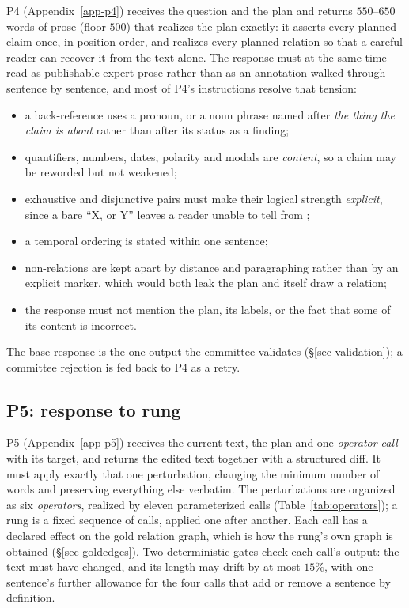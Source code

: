 P4 (Appendix~\ref{app-p4}) receives the question and the plan and returns $550$--$650$ words of prose (floor
$500$) that realizes the plan exactly: it asserts every planned claim once, in position order, and realizes every
planned relation so that a careful reader can recover it from the text alone. The response must at the same time
read as publishable expert prose rather than as an annotation walked through sentence by sentence, and most of
P4's instructions resolve that tension:
\begin{itemize}[leftmargin=1.4em,itemsep=1pt,topsep=2pt]
\item a back-reference uses a pronoun, or a noun phrase named after \emph{the thing the claim is about} rather than
  after its status as a finding;
\item quantifiers, numbers, dates, polarity and modals are \emph{content}, so a claim may be reworded but not
  weakened;
\item exhaustive and disjunctive pairs must make their logical strength \emph{explicit}, since a bare ``X, or Y''
  leaves a reader unable to tell  from ;
\item a temporal ordering is stated within one sentence;
\item non-relations are kept apart by distance and paragraphing rather than by an explicit marker, which would
  both leak the plan and itself draw a relation;
\item the response must not mention the plan, its labels, or the fact that some of its content is incorrect.
\end{itemize}
The base response is the one output the committee validates (\S\ref{sec-validation}); a committee rejection is fed
back to P4 as a retry.

\subsection{P5: response to rung}
\label{sec-p5}

P5 (Appendix~\ref{app-p5}) receives the current text, the plan and one \emph{operator call} with its target, and
returns the edited text together with a structured diff. It must apply exactly that one perturbation, changing the
minimum number of words and preserving everything else verbatim. The perturbations are organized as six
\emph{operators}, realized by eleven parameterized calls (Table~\ref{tab:operators}); a rung is a fixed sequence of
calls, applied one after another. Each call has a declared effect on the gold relation graph, which is how the
rung's own graph is obtained (\S\ref{sec-goldedges}). Two deterministic gates check each call's output: the text
must have changed, and its length may drift by at most $15\%$, with one sentence's further allowance for the four
calls that add or remove a sentence by definition.

